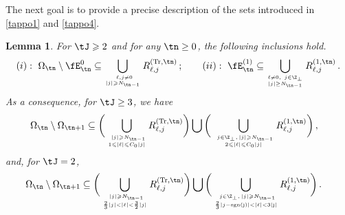 \documentclass[a4paper,reqno,10pt]{article}
\newtheorem{lem}{Lemma}[section]
\begin{document}
The next goal is to provide a precise description of the sets introduced in \eqref{tappo1} and \eqref{tappo4}.
\begin{lem}\label{lemma.empty.shell.n}
    For $\tJ\geqslant 2$ and for any $\tn \geq 0$, the following inclusions hold.
    \begin{equation}
       (i): \   \Omega_{\tn}\setminus {\fE}_{\tn}^{{{0}}} \subseteq \bigcup_{ \ \ell,j\neq 0 \atop   |j| \geqslant N_{\tn-1} } R_{\ell,j}^{({\rm Tr},\tn)}\,; \quad \quad (ii): \ \fE_{\tn}^{(1)} \subseteq \bigcup_{\ell \neq0 , \
    j\in \Z_{\perp}  \atop  |j| \geq N_{\tn-1} } R_{\ell,j}^{(1,\tn)} \,. \label{tappo3}
    \end{equation}
    As a consequence, for $\tJ\geq 3$, we have
    \begin{align}\label{compl.set.less1}
	\Omega_{\tn}\setminus\Omega_{\tn+1}& \subseteq \bigg(\bigcup_{ \ |j|\geqslant N_{\tn-1} \atop 1 \leqslant  |\ell| \leqslant C_0 |j| } R_{\ell,j}^{({\rm Tr},\tn)}\bigg)  \bigcup \bigg(\bigcup_{ \ j\in \Z_\perp,\, |j|\geqslant N_{\tn-1}  \atop 2\leqslant  |\ell| \leqslant C_0 |j| } R_{\ell,j}^{(1,\tn)}\bigg) \,,
\end{align}
and, for $\tJ=2$,
\begin{align}\label{compl.set.less-J2}
	\Omega_{\tn}\setminus\Omega_{\tn+1}& \subseteq \bigg(\bigcup_{ \ |j|\geqslant N_{\tn-1} \atop \frac23|j| < |\ell| < \frac32 |j| } R_{\ell,j}^{({\rm Tr},\tn)}\bigg)  \bigcup \bigg(\bigcup_{ \ j\in \Z_\perp,\, |j|\geqslant N_{\tn-1}  \atop \frac23|j-\rm{sgn}(j)|<  |\ell| < 3 |j| } R_{\ell,j}^{(1,\tn)}\bigg) \,.
\end{align}
\end{lem}
\end{document}
